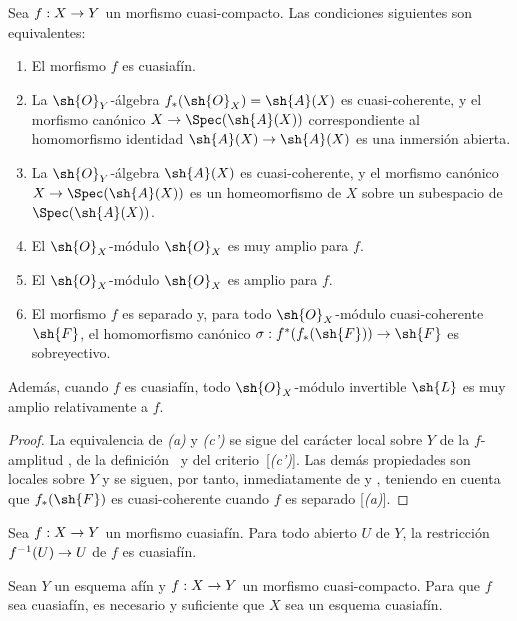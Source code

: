 \documentclass[oneside,10pt]{amsart}
\makeatletter
\newcommand{\ega@arrow}[2]{\mathchoice{#1}{#2}{#2}{#2}}
\renewcommand{\to}{\ega@arrow{\longrightarrow}{\rightarrow}}
\newcommand{\oldpage}[2][]{\marginnote{\normalfont\footnotesize\textbf{#1}~|~#2}\ignorespaces}
\let\EGAOriginalLabel\label
\renewcommand{\label}[1]{\phantomsection\EGAOriginalLabel{#1}}
\makeatother
\begin{document}
\begin{proposition}[5.1.6]
\label{II.5.1.6}
Sea $f:X\to Y$ un morfismo cuasi-compacto.
Las condiciones siguientes son equivalentes:
\begin{enumerate}
  \item[{\rm(a)}] El morfismo $f$ es cuasiafín.
  \item[{\rm(b)}] La $\sh{O}_Y$-álgebra $f_*(\sh{O}_X)=\sh{A}(X)$ es cuasi-coherente, y el morfismo canónico $X\to\Spec(\sh{A}(X))$ correspondiente al homomorfismo identidad $\sh{A}(X)\to\sh{A}(X)$  es una inmersión abierta.
  \item[{\rm(b')}] La $\sh{O}_Y$-álgebra $\sh{A}(X)$ es cuasi-coherente, y el morfismo canónico $X\to\Spec(\sh{A}(X))$ es un homeomorfismo de $X$ sobre un subespacio de $\Spec(\sh{A}(X))$.
  \item[{\rm(c)}] El $\sh{O}_X$-módulo $\sh{O}_X$ es muy amplio para $f$.
  \item[{\rm(c')}] El $\sh{O}_X$-módulo $\sh{O}_X$ es amplio para $f$.
  \item[{\rm(d)}] El morfismo $f$ es separado y, para todo $\sh{O}_X$-módulo cuasi-coherente $\sh{F}$, el homomorfismo canónico $\sigma:f^*(f_*(\sh{F}))\to\sh{F}$  es sobreyectivo.
\end{enumerate}

Además, cuando $f$ es cuasiafín, todo $\sh{O}_X$-módulo invertible $\sh{L}$ es muy amplio relativamente a $f$.
\end{proposition}

\begin{proof}
La equivalencia de \emph{(a)} y \emph{(c')} se sigue del carácter local sobre $Y$ de la $f$-amplitud , de la definición~ y del criterio~[\emph{(c')}].
Las demás propiedades son locales sobre $Y$
\oldpage[II]{96}
y se siguen, por tanto, inmediatamente de  y , teniendo en cuenta que $f_*(\sh{F})$ es cuasi-coherente cuando $f$ es separado [\emph{(a)}].
\end{proof}

\begin{corollary}[5.1.7]
\label{II.5.1.7}
Sea $f:X\to Y$ un morfismo cuasiafín.
Para todo abierto $U$ de $Y$, la restricción $f^{-1}(U)\to U$ de $f$ es cuasiafín.
\end{corollary}

\begin{corollary}[5.1.8]
\label{II.5.1.8}
Sean $Y$ un esquema afín y $f:X\to Y$ un morfismo cuasi-compacto.
Para que $f$ sea cuasiafín, es necesario y suficiente que $X$ sea un esquema cuasiafín.
\end{corollary}
\end{document}
